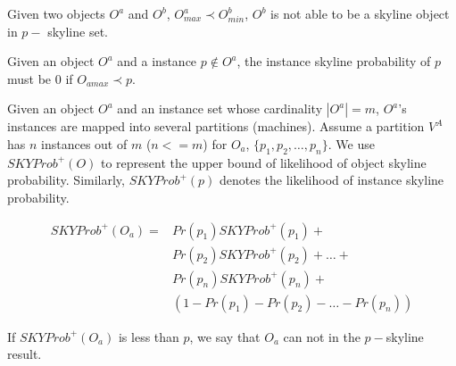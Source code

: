 \begin{prop}
\label{prop:1}
Given two objects $O^a$ and $O^b$, $O^a_{max} \prec O^b_{min}$, $O^b$ is not able to be a skyline object in $p-$ skyline set.
\end{prop}


\begin{prop}
\label{def:2}
Given an object $O^a$ and a instance $p \notin O^a$, the instance skyline probability of $p$ must be 0 if $O_{amax} \prec p$.
\end{prop}


\begin{prop}
\label{def:3}
Given an object $O^a$ and an instance set whose cardinality $ |O^a| = m$, $O^a$'s instances are mapped into several partitions (machines). Assume a partition $V^A$ has $n$ instances out of $m$ ($n<=m$) for $O_a$, $\{p_1, p_2, \dots, p_n\}$. We use $SKYProb^{+}(O)$ to represent the upper bound of likelihood of object skyline probability. Similarly, $SKYProb^{+}(p)$ denotes the likelihood of instance skyline probability.


\begin{equation}
\label{objectUpper}
    \begin{aligned}
SKYProb^{+}(O_a) = & Pr(p_1)SKYProb^{+}(p_1) + \\ 
& Pr(p_2)SKYProb^{+}(p_2) + \dots + \\
& Pr(p_n)SKYProb^{+}(p_n)+ \\
& (1-Pr(p_1) - Pr(p_2) - \dots -Pr(p_n)) 
    \end{aligned}
\end{equation}

If $SKYProb^{+}(O_a)$ is less than $p$, we say that $O_a$ can not in the $p-$skyline result.

\end{prop}

